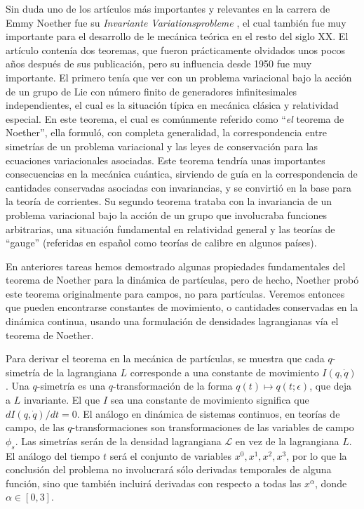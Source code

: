 \documentclass[a4paper,10pt]{article}
\numberwithin{equation}{section}
\begin{document}
Sin duda uno de los artículos más importantes y relevantes en la carrera de 
Emmy Noether fue su \emph{Invariante Variationsprobleme} \cite{noether}, el cual también 
fue muy importante para el desarrollo de le mecánica teórica en el resto del siglo 
XX. El artículo contenía dos teoremas, que fueron prácticamente olvidados unos pocos 
años después de sus publicación, pero su influencia desde 1950 fue muy importante. 
El primero tenía que ver con un problema variacional bajo la acción de un grupo de 
Lie con número finito de generadores infinitesimales independientes, el cual es 
la situación típica en mecánica clásica y relatividad especial. En este teorema, 
el cual es comúnmente referido como ``\emph{el} teorema de Noether'', ella formuló, 
con completa generalidad, la correspondencia entre simetrías de un problema variacional 
y las leyes de conservación para las ecuaciones variacionales asociadas. Este teorema 
tendría unas importantes consecuencias en la mecánica cuántica, sirviendo de guía 
en la correspondencia de cantidades conservadas asociadas con invariancias, y se 
convirtió en la base para la teoría de corrientes. Su segundo teorema trataba con 
la invariancia de un problema variacional bajo la acción de un grupo que involucraba 
funciones arbitrarias, una situación fundamental en relatividad general y las 
teorías de ``gauge'' (referidas en español como teorías de calibre en algunos países).

\vspace{.3cm}

En anteriores tareas hemos demostrado algunas propiedades fundamentales del teorema de 
Noether para la dinámica de partículas, pero de hecho, Noether probó este teorema 
originalmente para campos, no para partículas. Veremos entonces que pueden encontrarse 
constantes de movimiento, o cantidades conservadas en la dinámica continua, usando 
una formulación de densidades lagrangianas vía el teorema de Noether.

\vspace{.3cm}

Para derivar el teorema en la mecánica de partículas, se muestra que cada $q$-simetría 
de la lagrangiana $L$ corresponde a una constante de movimiento $I(q,\dot{q})$. Una 
$q$-simetría es una $q$-transformación de la forma $q(t) \mapsto q(t;\epsilon)$, que 
deja a $L$ invariante. El que $I$ sea una constante de movimiento significa que 
$dI(q,\dot{q})/dt = 0$. El análogo en dinámica de sistemas continuos, en teorías 
de campo, de las $q$-transformaciones son transformaciones de las variables de 
campo $\phi_s$. Las simetrías serán de la densidad lagrangiana $\mathcal{L}$ en vez 
de la lagrangiana $L$. El análogo del tiempo $t$ será el conjunto de variables 
$x^0, x^1, x^2, x^3$, por lo que la conclusión del problema no involucrará sólo 
derivadas temporales de alguna función, sino que también incluirá derivadas con 
respecto a todas las $x^\alpha$, donde $\alpha \in [0,3]$. 
\end{document}
